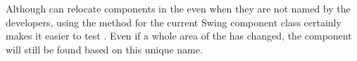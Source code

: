 
Although \gd{} can relocate components in the \gdaut{} even when they are not named by the developers, using the  method for the current Swing component class certainly makes it easier to test \gdauts{}. Even if a whole area of the \gdaut{} has changed, the component will still be found based on this unique name. 
